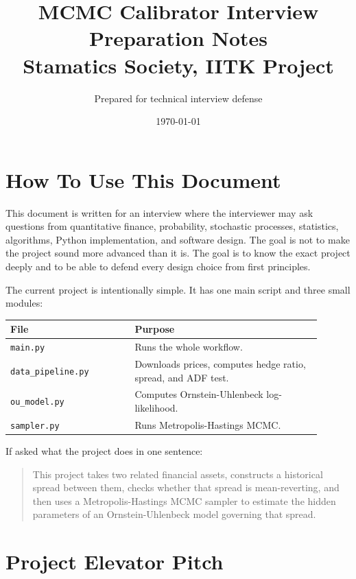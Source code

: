 \documentclass[11pt]{article}
\title{
  \textbf{MCMC Calibrator Interview Preparation Notes}\\
  \large Stamatics Society, IITK Project
}
\author{Prepared for technical interview defense}
\date{\today}
\newcommand{\code}[1]{\texttt{#1}}
\begin{document}
\maketitle
\tableofcontents
\newpage

\section{How To Use This Document}

This document is written for an interview where the interviewer may ask questions
from quantitative finance, probability, stochastic processes, statistics,
algorithms, Python implementation, and software design. The goal is not to make
the project sound more advanced than it is. The goal is to know the exact
project deeply and to be able to defend every design choice from first
principles.

The current project is intentionally simple. It has one main script and three
small modules:

\begin{center}
\begin{tabular}{p{0.36\linewidth}p{0.54\linewidth}}
\toprule
\textbf{File} & \textbf{Purpose}\\
\midrule
\code{main.py} & Runs the whole workflow.\\
\code{data\_pipeline.py} & Downloads prices, computes hedge ratio, spread, and ADF test.\\
\code{ou\_model.py} & Computes Ornstein-Uhlenbeck log-likelihood.\\
\code{sampler.py} & Runs Metropolis-Hastings MCMC.\\
\bottomrule
\end{tabular}
\end{center}

If asked what the project does in one sentence:

\begin{quote}
This project takes two related financial assets, constructs a historical spread
between them, checks whether that spread is mean-reverting, and then uses a
Metropolis-Hastings MCMC sampler to estimate the hidden parameters of an
Ornstein-Uhlenbeck model governing that spread.
\end{quote}

\section{Project Elevator Pitch}
\end{document}
